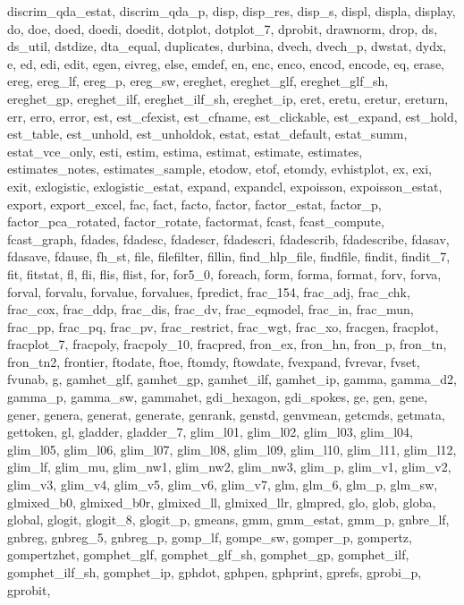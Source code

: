 {{    discrim_qda_estat, discrim_qda_p, disp, disp_res, disp_s, displ, displa, display, do, doe, doed, doedi, doedit, dotplot, dotplot_7, dprobit, drawnorm, drop, ds, ds_util, dstdize, dta_equal, duplicates, durbina, dvech,
    dvech_p, dwstat, dydx, e, ed, edi, edit, egen, eivreg, else, emdef, en, enc, enco, encod, encode, eq, erase, ereg, ereg_lf, ereg_p, ereg_sw, ereghet, ereghet_glf, ereghet_glf_sh, ereghet_gp, ereghet_ilf,
    ereghet_ilf_sh, ereghet_ip, eret, eretu, eretur, ereturn, err, erro, error, est, est_cfexist, est_cfname, est_clickable, est_expand, est_hold, est_table, est_unhold, est_unholdok, estat, estat_default, estat_summ,
    estat_vce_only, esti, estim, estima, estimat, estimate, estimates, estimates_notes, estimates_sample, etodow, etof, etomdy, evhistplot, ex, exi, exit, exlogistic, exlogistic_estat, expand, expandcl, expoisson,
    expoisson_estat, export, export_excel, fac, fact, facto, factor, factor_estat, factor_p, factor_pca_rotated, factor_rotate, factormat, fcast, fcast_compute, fcast_graph, fdades, fdadesc, fdadescr, fdadescri,
    fdadescrib, fdadescribe, fdasav, fdasave, fdause, fh_st, file, filefilter, fillin, find_hlp_file, findfile, findit, findit_7, fit, fitstat, fl, fli, flis, flist, for, for5_0, foreach, form, forma, format, forv, forva,
    forval, forvalu, forvalue, forvalues, fpredict, frac_154, frac_adj, frac_chk, frac_cox, frac_ddp, frac_dis, frac_dv, frac_eqmodel, frac_in, frac_mun, frac_pp, frac_pq, frac_pv, frac_restrict, frac_wgt, frac_xo,
    fracgen, fracplot, fracplot_7, fracpoly, fracpoly_10, fracpred, fron_ex, fron_hn, fron_p, fron_tn, fron_tn2, frontier, ftodate, ftoe, ftomdy, ftowdate, fvexpand, fvrevar, fvset, fvunab, g, gamhet_glf, gamhet_gp,
    gamhet_ilf, gamhet_ip, gamma, gamma_d2, gamma_p, gamma_sw, gammahet, gdi_hexagon, gdi_spokes, ge, gen, gene, gener, genera, generat, generate, genrank, genstd, genvmean, getcmds, getmata, gettoken, gl, gladder,
    gladder_7, glim_l01, glim_l02, glim_l03, glim_l04, glim_l05, glim_l06, glim_l07, glim_l08, glim_l09, glim_l10, glim_l11, glim_l12, glim_lf, glim_mu, glim_nw1, glim_nw2, glim_nw3, glim_p, glim_v1, glim_v2, glim_v3,
    glim_v4, glim_v5, glim_v6, glim_v7, glm, glm_6, glm_p, glm_sw, glmixed_b0, glmixed_b0r, glmixed_ll, glmixed_llr, glmpred, glo, glob, globa, global, glogit, glogit_8, glogit_p, gmeans, gmm, gmm_estat, gmm_p, gnbre_lf,
    gnbreg, gnbreg_5, gnbreg_p, gomp_lf, gompe_sw, gomper_p, gompertz, gompertzhet, gomphet_glf, gomphet_glf_sh, gomphet_gp, gomphet_ilf, gomphet_ilf_sh, gomphet_ip, gphdot, gphpen, gphprint, gprefs, gprobi_p, gprobit,
}}
